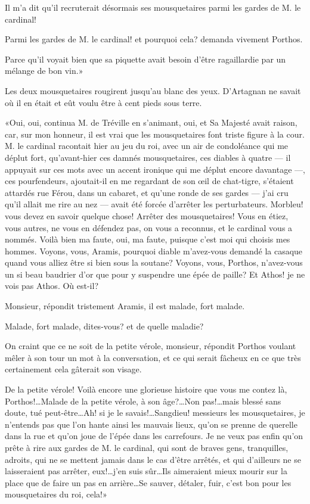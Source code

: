\speak  Il m'a dit qu'il recruterait désormais ses mousquetaires parmi les gardes de M. le cardinal! 

\speak  Parmi les gardes de M. le cardinal! et pourquoi cela? demanda vivement Porthos. 

\speak  Parce qu'il voyait bien que sa piquette avait besoin d'être ragaillardie par un mélange de bon vin.» 

Les deux mousquetaires rougirent jusqu'au blanc des yeux. D'Artagnan ne savait où il en était et eût voulu être à cent pieds sous terre. 

«Oui, oui, continua M. de Tréville en s'animant, oui, et Sa Majesté avait raison, car, sur mon honneur, il est vrai que les mousquetaires font triste figure à la cour. M. le cardinal racontait hier au jeu du roi, avec un air de condoléance qui me déplut fort, qu'avant-hier ces damnés mousquetaires, ces diables à quatre --- il appuyait sur ces mots avec un accent ironique qui me déplut encore davantage ---, ces pourfendeurs, ajoutait-il en me regardant de son œil de chat-tigre, s'étaient attardés rue Férou, dans un cabaret, et qu'une ronde de ses gardes --- j'ai cru qu'il allait me rire au nez --- avait été forcée d'arrêter les perturbateurs. Morbleu! vous devez en savoir quelque chose! Arrêter des mousquetaires! Vous en étiez, vous autres, ne vous en défendez pas, on vous a reconnus, et le cardinal vous a nommés. Voilà bien ma faute, oui, ma faute, puisque c'est moi qui choisis mes hommes. Voyons, vous, Aramis, pourquoi diable m'avez-vous demandé la casaque quand vous alliez être si bien sous la soutane? Voyons, vous, Porthos, n'avez-vous un si beau baudrier d'or que pour y suspendre une épée de paille? Et Athos! je ne vois pas Athos. Où est-il? 

\speak  Monsieur, répondit tristement Aramis, il est malade, fort malade. 

\speak  Malade, fort malade, dites-vous? et de quelle maladie? 

\speak  On craint que ce ne soit de la petite vérole, monsieur, répondit Porthos voulant mêler à son tour un mot à la conversation, et ce qui serait fâcheux en ce que très certainement cela gâterait son visage. 

\speak  De la petite vérole! Voilà encore une glorieuse histoire que vous me contez là, Porthos!\dots Malade de la petite vérole, à son âge?\dots Non pas!\dots mais blessé sans doute, tué peut-être\dots Ah! si je le savais!\dots Sangdieu! messieurs les mousquetaires, je n'entends pas que l'on hante ainsi les mauvais lieux, qu'on se prenne de querelle dans la rue et qu'on joue de l'épée dans les carrefours. Je ne veux pas enfin qu'on prête à rire aux gardes de M. le cardinal, qui sont de braves gens, tranquilles, adroits, qui ne se mettent jamais dans le cas d'être arrêtés, et qui d'ailleurs ne se laisseraient pas arrêter, eux!\dots j'en suis sûr\dots Ils aimeraient mieux mourir sur la place que de faire un pas en arrière\dots Se sauver, détaler, fuir, c'est bon pour les mousquetaires du roi, cela!» 

